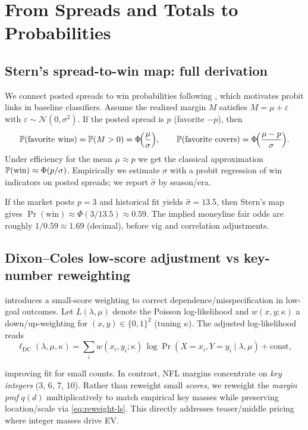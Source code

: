 \section{From Spreads and Totals to Probabilities}
\subsection{Stern’s spread-to-win map: full derivation}\label{subsec:stern-derivation}
We connect posted spreads to win probabilities following \citet{stern1991}, which motivates probit links in baseline classifiers.
Assume the realized margin $M$ satisfies $M=\mu+\varepsilon$ with $\varepsilon\sim\mathcal{N}(0,\sigma^2)$. If the posted spread is $p$
(favorite $-p$), then
\begin{equation}\label{eq:stern-win}
\mathbb{P}(\text{favorite wins})=\mathbb{P}(M>0)=\Phi\!\Big(\frac{\mu}{\sigma}\Big),\qquad
\mathbb{P}(\text{favorite covers})=\Phi\!\Big(\frac{\mu-p}{\sigma}\Big).
\end{equation}
\begingroup\sloppy
Under efficiency for the mean $\mu\approx p$ we get the classical approximation
$\mathbb{P}(\text{win})\approx\Phi(p/\sigma)$. Empirically we estimate $\sigma$ with a probit regression of win indicators on posted spreads; we report $\hat\sigma$ by season/era.
\endgroup

\begin{example}
If the market posts $p=3$ and historical fit yields $\hat\sigma=13.5$, then Stern’s map gives
$\Pr(\text{win})\approx\Phi(3/13.5)\approx 0.59$. The implied moneyline fair odds are roughly $1/0.59\approx1.69$ (decimal), before vig and correlation adjustments.
\end{example}

\subsection{Dixon--Coles low-score adjustment vs key-number reweighting}\label{subsec:dc-vs-keys}
\begin{sloppypar}
 introduces a small-score weighting to correct dependence/misspecification in low-goal outcomes.
Let $L(\lambda,\mu)$ denote the Poisson log-likelihood and $w(x,y;\kappa)$ a down/up-weighting for $(x,y)\in\{0,1\}^2$ (tuning $\kappa$).
The adjusted log-likelihood reads
\[\ell_{\text{DC}}(\lambda,\mu,\kappa)=\sum_i w(x_i,y_i;\kappa)\,\log \Pr(X=x_i,Y=y_i\mid \lambda,\mu)+\text{const},\]
\end{sloppypar}
improving fit for small counts.
In contrast, NFL margins concentrate on \emph{key integers} (3, 6, 7, 10). Rather than reweight small \emph{scores}, we reweight the \emph{margin pmf} $q(d)$ multiplicatively to match empirical key masses while preserving location/scale via \eqref{eq:reweight-ls}. This directly addresses teaser/middle pricing where integer masses drive EV.

